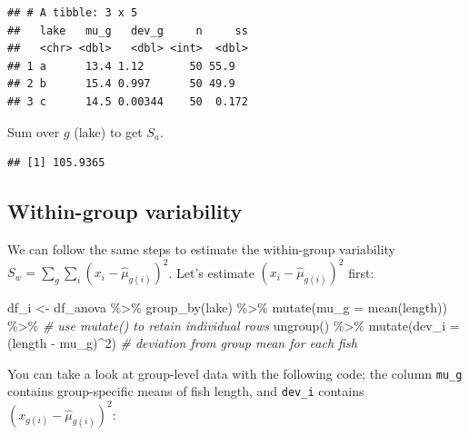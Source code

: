 \documentclass[
]{book}
\newenvironment{Shaded}{\begin{snugshade}}{\end{snugshade}}
\newcommand{\AttributeTok}[1]{\textcolor[rgb]{0.77,0.63,0.00}{#1}}
\newcommand{\CommentTok}[1]{\textcolor[rgb]{0.56,0.35,0.01}{\textit{#1}}}
\newcommand{\DecValTok}[1]{\textcolor[rgb]{0.00,0.00,0.81}{#1}}
\newcommand{\FunctionTok}[1]{\textcolor[rgb]{0.00,0.00,0.00}{#1}}
\newcommand{\NormalTok}[1]{#1}
\newcommand{\OtherTok}[1]{\textcolor[rgb]{0.56,0.35,0.01}{#1}}
\newcommand{\SpecialCharTok}[1]{\textcolor[rgb]{0.00,0.00,0.00}{#1}}
\begin{document}
\begin{verbatim}
## # A tibble: 3 x 5
##   lake   mu_g   dev_g     n     ss
##   <chr> <dbl>   <dbl> <int>  <dbl>
## 1 a      13.4 1.12       50 55.9  
## 2 b      15.4 0.997      50 49.9  
## 3 c      14.5 0.00344    50  0.172
\end{verbatim}

Sum over \(g\) (lake) to get \(S_a\).

\begin{Shaded}
\end{Shaded}

\begin{verbatim}
## [1] 105.9365
\end{verbatim}

\hypertarget{within-group-variability}{%
\subsection{Within-group variability}\label{within-group-variability}}

We can follow the same steps to estimate the within-group variability \(S_w = \sum_g \sum_i (x_{i} - \hat{\mu}_{g(i)})^2\). Let's estimate \((x_{i} - \hat{\mu}_{g(i)})^2\) first:

\begin{Shaded}
\begin{Highlighting}[]
\NormalTok{df\_i }\OtherTok{\textless{}{-}}\NormalTok{ df\_anova }\SpecialCharTok{\%\textgreater{}\%} 
  \FunctionTok{group\_by}\NormalTok{(lake) }\SpecialCharTok{\%\textgreater{}\%} 
  \FunctionTok{mutate}\NormalTok{(}\AttributeTok{mu\_g =} \FunctionTok{mean}\NormalTok{(length)) }\SpecialCharTok{\%\textgreater{}\%} \CommentTok{\# use mutate() to retain individual rows}
  \FunctionTok{ungroup}\NormalTok{() }\SpecialCharTok{\%\textgreater{}\%} 
  \FunctionTok{mutate}\NormalTok{(}\AttributeTok{dev\_i =}\NormalTok{ (length }\SpecialCharTok{{-}}\NormalTok{ mu\_g)}\SpecialCharTok{\^{}}\DecValTok{2}\NormalTok{) }\CommentTok{\# deviation from group mean for each fish}
\end{Highlighting}
\end{Shaded}

You can take a look at group-level data with the following code; the column \texttt{mu\_g} contains group-specific means of fish length, and \texttt{dev\_i} contains \((x_{g(i)} - \hat{\mu}_{g(i)})^2\):
\end{document}
